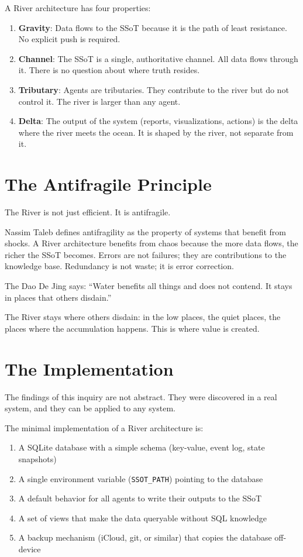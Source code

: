 \documentclass[12pt,a4paper,oneside]{book}
\begin{document}
A River architecture has four properties:

\begin{enumerate}
  \item \textbf{Gravity}: Data flows to the SSoT because it is the path of least resistance. No explicit push is required.
  \item \textbf{Channel}: The SSoT is a single, authoritative channel. All data flows through it. There is no question about where truth resides.
  \item \textbf{Tributary}: Agents are tributaries. They contribute to the river but do not control it. The river is larger than any agent.
  \item \textbf{Delta}: The output of the system (reports, visualizations, actions) is the delta where the river meets the ocean. It is shaped by the river, not separate from it.
\end{enumerate}

\section{The Antifragile Principle}

The River is not just efficient. It is antifragile.

Nassim Taleb defines antifragility as the property of systems that benefit from shocks. A River architecture benefits from chaos because the more data flows, the richer the SSoT becomes. Errors are not failures; they are contributions to the knowledge base. Redundancy is not waste; it is error correction.

The Dao De Jing says: \enquote{Water benefits all things and does not contend. It stays in places that others disdain.}

The River stays where others disdain: in the low places, the quiet places, the places where the accumulation happens. This is where value is created.

\section{The Implementation}

The findings of this inquiry are not abstract. They were discovered in a real system, and they can be applied to any system.

The minimal implementation of a River architecture is:

\begin{enumerate}
  \item A SQLite database with a simple schema (key-value, event log, state snapshots)
  \item A single environment variable (\texttt{SSOT\_PATH}) pointing to the database
  \item A default behavior for all agents to write their outputs to the SSoT
  \item A set of views that make the data queryable without SQL knowledge
  \item A backup mechanism (iCloud, git, or similar) that copies the database off-device
\end{enumerate}
\end{document}
